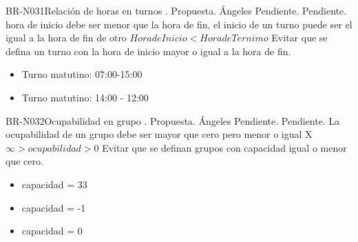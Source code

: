 \begin{BusinessRule}{BR-N031}{Relación de horas en turnos}
	{\bcCondition}    %
	{\btEnabler}     %
	{\blControlling}    %
	.
	\BRItem[Estado] Propuesta.
	 Ángeles
	 Pendiente.
	 Pendiente.
	\BRItem[Descripción] hora de inicio debe ser menor que la hora de fin, el inicio de un turno puede ser el igual a la hora de fin de otro
	\BRItem[Sentencia]  $Hora de Inicio < Hora de Ternimo$
		\BRItem[Motivación] Evitar que se defina un turno con la hora de inicio mayor o igual a la hora de fin.
		 \cdtEmpty
		\begin{itemize}
			\item Turno matutino: 07:00-15:00
		\end{itemize}
		 \cdtEmpty
		\begin{itemize}
			\item Turno matutino: 14:00 - 12:00
	 	\end{itemize}
\end{BusinessRule}

\begin{BusinessRule}{BR-N032}{Ocupabilidad en grupo}
	{\bcCondition}    %
	{\btEnabler}     %
	{\blControlling}    %
	.
	\BRItem[Estado] Propuesta.
	 Ángeles
	 Pendiente.
	 Pendiente.
	\BRItem[Descripción] La ocupabilidad de un grupo debe ser mayor que cero pero menor o igual X
	\BRItem[Sentencia]  $ \infty> ocupabilidad > 0$
	\BRItem[Motivación] Evitar que se definan grupos con capacidad igual o menor que cero.
		 \cdtEmpty
		\begin{itemize}
			\item capacidad = 33
		\end{itemize}
		 \cdtEmpty
		\begin{itemize}
			\item capacidad = -1
			\item capacidad = 0
		\end{itemize}
\end{BusinessRule}


